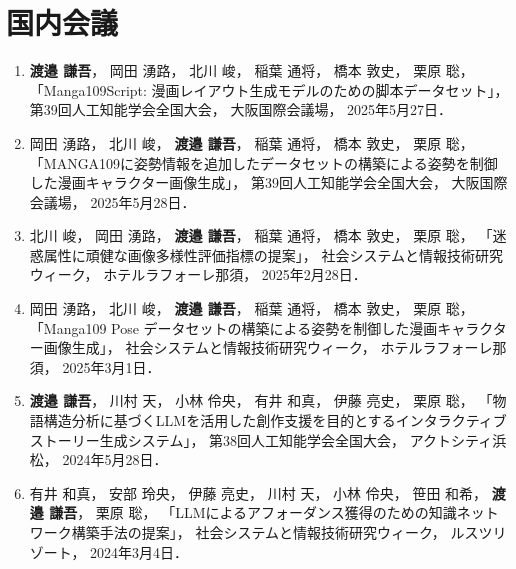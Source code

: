 \documentclass[a4j,12pt,dvipdfmx]{jsreport}
\begin{document}
\section*{国内会議}
\begin{enumerate}[label=(\roman*)]

   \item
         \textbf{渡邉 謙吾}，
         岡田 湧路，
         北川 峻，
         稲葉 通将，
         橋本 敦史，
         栗原 聡，
         「Manga109Script: 漫画レイアウト生成モデルのための脚本データセット」，
         第39回人工知能学会全国大会，
         大阪国際会議場，
         2025年5月27日．

   \item
         岡田 湧路，
         北川 峻，
         \textbf{渡邉 謙吾}，
         稲葉 通将，
         橋本 敦史，
         栗原 聡，
         「MANGA109に姿勢情報を追加したデータセットの構築による姿勢を制御した漫画キャラクター画像生成」，
         第39回人工知能学会全国大会，
         大阪国際会議場，
         2025年5月28日．

   \item
         北川 峻，
         岡田 湧路，
         \textbf{渡邉 謙吾}，
         稲葉 通将，
         橋本 敦史，
         栗原 聡，
         「迷惑属性に頑健な画像多様性評価指標の提案」，
         社会システムと情報技術研究ウィーク，
         ホテルラフォーレ那須，
         2025年2月28日．

   \item
         岡田 湧路，
         北川 峻，
         \textbf{渡邉 謙吾}，
         稲葉 通将，
         橋本 敦史，
         栗原 聡，
         「Manga109 Pose データセットの構築による姿勢を制御した漫画キャラクター画像生成」，
         社会システムと情報技術研究ウィーク，
         ホテルラフォーレ那須，
         2025年3月1日．

   \item
         \textbf{渡邉 謙吾}，
         川村 天，
         小林 伶央，
         有井 和真，
         伊藤 亮史，
         栗原 聡，
         「物語構造分析に基づくLLMを活用した創作支援を目的とするインタラクティブストーリー生成システム」，
         第38回人工知能学会全国大会，
         アクトシティ浜松，
         2024年5月28日．

   \item
         有井 和真，
         安部 玲央，
         伊藤 亮史，
         川村 天，
         小林 伶央，
         笹田 和希，
         \textbf{渡邉 謙吾}，
         栗原 聡，
         「LLMによるアフォーダンス獲得のための知識ネットワーク構築手法の提案」，
         社会システムと情報技術研究ウィーク，
         ルスツリゾート，
         2024年3月4日．


\end{enumerate}
\end{document}
